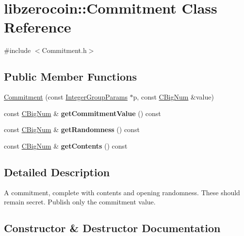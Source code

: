 \hypertarget{classlibzerocoin_1_1_commitment}{}\section{libzerocoin\+::Commitment Class Reference}
\label{classlibzerocoin_1_1_commitment}


{\ttfamily \#include $<$Commitment.\+h$>$}

\subsection*{Public Member Functions}
\begin{DoxyCompactItemize}
\item 
\mbox{\hyperlink{classlibzerocoin_1_1_commitment_a009eaae23946cf89430297c9f676ec3e}{Commitment}} (const \mbox{\hyperlink{classlibzerocoin_1_1_integer_group_params}{Integer\+Group\+Params}} $\ast$p, const \mbox{\hyperlink{class_c_big_num}{C\+Big\+Num}} \&value)
\item 
\mbox{\label{classlibzerocoin_1_1_commitment_a512ade1b225b10f92f71b3c05869c23a}} 
const \mbox{\hyperlink{class_c_big_num}{C\+Big\+Num}} \& {\bfseries get\+Commitment\+Value} () const
\item 
\mbox{\label{classlibzerocoin_1_1_commitment_ac84eccbba59e5c0cb76ee8fd827d80de}} 
const \mbox{\hyperlink{class_c_big_num}{C\+Big\+Num}} \& {\bfseries get\+Randomness} () const
\item 
\mbox{\label{classlibzerocoin_1_1_commitment_acde85382375c1ded6b51612903cd1ac7}} 
const \mbox{\hyperlink{class_c_big_num}{C\+Big\+Num}} \& {\bfseries get\+Contents} () const
\end{DoxyCompactItemize}


\subsection{Detailed Description}
A commitment, complete with contents and opening randomness. These should remain secret. Publish only the commitment value. 

\subsection{Constructor \& Destructor Documentation}
\mbox{\label{classlibzerocoin_1_1_commitment_a009eaae23946cf89430297c9f676ec3e}} 
